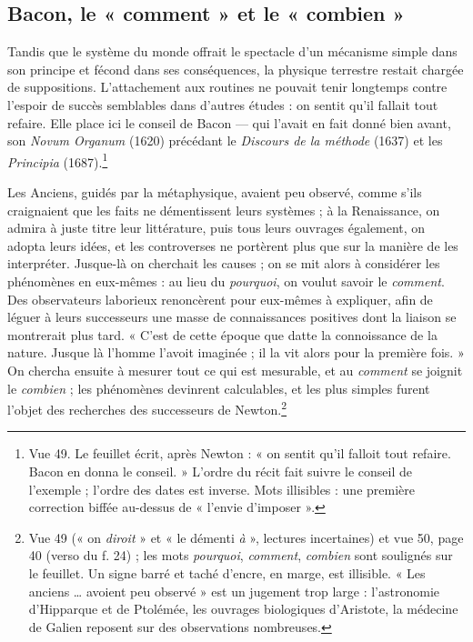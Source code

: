 \documentclass[11pt,a4paper]{article}
\begin{document}
\subsection*{Bacon, le « comment » et le « combien »}

Tandis que le système du monde offrait le spectacle d'un mécanisme simple dans
son principe et fécond dans ses conséquences, la physique terrestre restait
chargée de suppositions. L'attachement aux routines ne pouvait tenir longtemps
contre l'espoir de succès semblables dans d'autres études : on sentit qu'il
fallait tout refaire. Elle place ici le conseil de Bacon — qui l'avait en fait
donné bien avant, son \emph{Novum Organum} (1620) précédant le
\emph{Discours de la méthode} (1637) et les \emph{Principia} (1687).\footnote{Vue
49. Le feuillet écrit, après Newton : « on sentit qu'il falloit tout refaire.
Bacon en donna le conseil. » L'ordre du récit fait suivre le conseil de
l'exemple ; l'ordre des dates est inverse. Mots illisibles : une première
correction biffée au-dessus de « l'envie d'imposer ».}

Les Anciens, guidés par la métaphysique, avaient peu observé, comme s'ils
craignaient que les faits ne démentissent leurs systèmes ; à la Renaissance, on
admira à juste titre leur littérature, puis tous leurs ouvrages également, on
adopta leurs idées, et les controverses ne portèrent plus que sur la manière de
les interpréter. Jusque-là on cherchait les causes ; on se mit alors à
considérer les phénomènes en eux-mêmes : au lieu du \emph{pourquoi}, on voulut
savoir le \emph{comment}. Des observateurs laborieux renoncèrent pour eux-mêmes
à expliquer, afin de léguer à leurs successeurs une masse de connaissances
positives dont la liaison se montrerait plus tard. « C'est de cette époque que
datte la connoissance de la nature. Jusque là l'homme l'avoit imaginée ; il la
vit alors pour la première fois. » On chercha ensuite à mesurer tout ce qui est
mesurable, et au \emph{comment} se joignit le \emph{combien} ; les phénomènes
devinrent calculables, et les plus simples furent l'objet des recherches des
successeurs de Newton.\footnote{Vue 49 (« on \emph{diroit} » et « le démenti
\emph{à} », lectures incertaines) et vue 50, page 40 (verso du f. 24) ; les
mots \emph{pourquoi}, \emph{comment}, \emph{combien} sont soulignés sur le
feuillet. Un signe barré et taché d'encre, en marge, est illisible. « Les
anciens \ldots{} avoient peu observé » est un jugement trop large :
l'astronomie d'Hipparque et de Ptolémée, les ouvrages biologiques d'Aristote,
la médecine de Galien reposent sur des observations nombreuses.}
\end{document}
